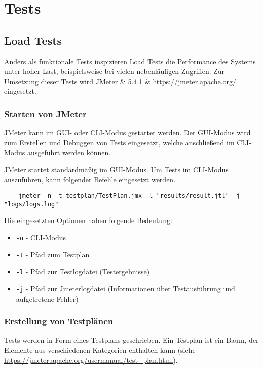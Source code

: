 \chapter{Tests}

\section{Load Tests}

Anders als funktionale Tests inspizieren Load Tests die Performance des Systems unter hoher Last,
beispielsweise bei vielen nebenläufigen Zugriffen.
Zur Umsetzung dieser Tests wird JMeter \& 5.4.1 \& \url{https://jmeter.apache.org/} eingesetzt.

\subsection{Starten von JMeter}

JMeter kann im GUI- oder CLI-Modus gestartet werden.
Der GUI-Modus wird zum Erstellen und Debuggen von Tests eingesetzt,
welche anschließend im CLI-Modus ausgeführt werden können.

JMeter startet standardmäßig im GUI-Modus.
Um Tests im CLI-Modus auszuführen, kann folgender Befehle eingesetzt werden.

\begin{lstlisting}
    jmeter -n -t testplan/TestPlan.jmx -l "results/result.jtl" -j "logs/logs.log"
\end{lstlisting}

Die eingesetzten Optionen haben folgende Bedeutung:

\begin{itemize}
    \item \texttt{-n} - CLI-Modus
    \item \texttt{-t} - Pfad zum Testplan
    \item \texttt{-l} - Pfad zur Testlogdatei (Testergebnisse)
    \item \texttt{-j} - Pfad zur Jmeterlogdatei (Informationen über Testausführung und aufgetretene Fehler)
\end{itemize}

\subsection{Erstellung von Testplänen}

Tests werden in Form eines Testplans geschrieben.
Ein Testplan ist ein Baum, der Elemente aus verschiedenen Kategorien enthalten kann (siehe \url{https://jmeter.apache.org/usermanual/test_plan.html}).

